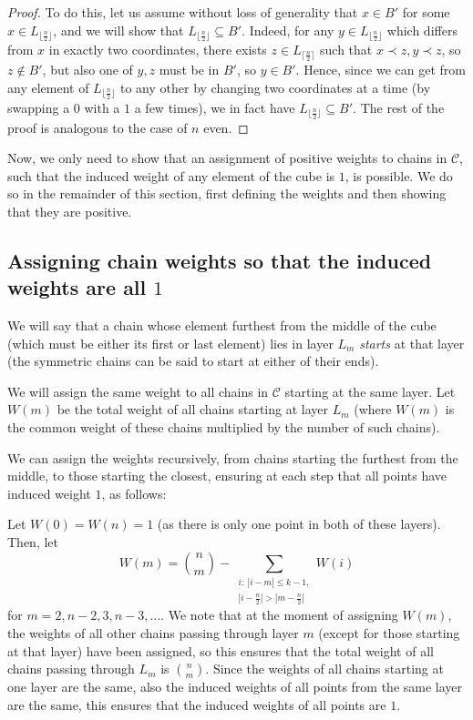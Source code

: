 \documentclass[11pt, reqno]{amsart}
\numberwithin{equation}{section}
\begin{document}
\begin{proof}
    To do this, let us assume without loss of generality that $x \in B'$ for some $x \in L_{\lfloor \frac{n}{2} \rfloor}$, and we will show that $L_{\lfloor \frac{n}{2} \rfloor} \subseteq B'$. Indeed, for any $y \in L_{\lfloor \frac{n}{2} \rfloor}$ which differs from $x$ in exactly two coordinates, there exists $z \in L_{\lceil \frac{n}{2} \rceil}$ such that $x \prec z, y \prec z$, so $z \notin B'$, but also one of $y, z$ must be in $B'$, so $y \in B'$. Hence, since we can get from any element of $L_{\lfloor \frac{n}{2} \rfloor}$ to any other by changing two coordinates at a time (by swapping a $0$ with a $1$ a few times), we in fact have $L_{\lfloor \frac{n}{2} \rfloor} \subseteq B'$. The rest of the proof is analogous to the case of $n$ even.
\end{proof}

Now, we only need to show that an assignment of positive weights to chains in $\mathcal{C}$, such that the induced weight of any element of the cube is $1$, is possible. We do so in the remainder of this section, first defining the weights and then showing that they are positive.

\subsection{Assigning chain weights so that the induced weights are all \texorpdfstring{$1$}{1}}

We will say that a chain whose element furthest from the middle of the cube (which must be either its first or last element) lies in layer $L_m$ \emph{starts} at that layer (the symmetric chains can be said to start at either of their ends).

We will assign the same weight to all chains in $\mathcal{C}$ starting at the same layer. Let $W(m)$ be the total weight of all chains starting at layer $L_m$ (where $W(m)$ is the common weight of these chains multiplied by the number of such chains).

We can assign the weights recursively, from chains starting the furthest from the middle, to those starting the closest, ensuring at each step that all points have induced weight $1$, as follows:

Let $W(0)=W(n)=1$ (as there is only one point in both of these layers). Then, let
\begin{equation}
    W(m)=\binom{n}{m}-\sum_{\substack{i: \ |i-m| \leqslant k-1, \\
    |i-\frac{n}{2}|>|m-\frac{n}{2}|}} W(i)
\end{equation}
for $m=2, n-2, 3, n-3, \dots$. We note that at the moment of assigning $W(m)$, the weights of all other chains passing through layer $m$ (except for those starting at that layer) have been assigned, so this ensures that the total weight of all chains passing through $L_m$ is $\binom{n}{m}$. Since the weights of all chains starting at one layer are the same, also the induced weights of all points from the same layer are the same, this ensures that the induced weights of all points are $1$.
\end{document}
